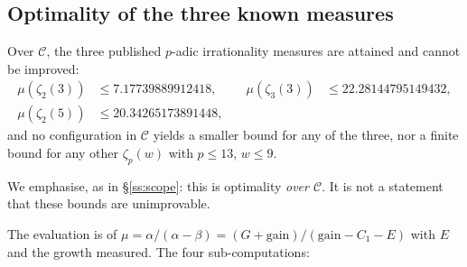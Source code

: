 \subsection{Optimality of the three known measures}\label{ss:optimal}

\begin{theorem}\label{thm:optimal}
 Over $\mathcal C$, the three
published $p$-adic irrationality measures are attained and cannot be improved:
\[
\begin{aligned}
 \mu(\zeta_2(3))&\le7.17739889912418, &\quad
 \mu(\zeta_3(3))&\le22.28144795149432,\\
 \mu(\zeta_2(5))&\le20.34265173891448, &&
\end{aligned}
\]
and no configuration in $\mathcal C$ yields a smaller bound for any of the three, nor a
finite bound for any other $\zeta_p(w)$ with $p\le13$, $w\le9$.
\end{theorem}

We emphasise, as in \S\ref{ss:scope}: this is optimality \emph{over $\mathcal C$}. It is not
a statement that these bounds are unimprovable.

The evaluation is of $\mu=\alpha/(\alpha-\beta)=(G+\mathrm{gain})/(\mathrm{gain}-C_1-E)$
with $E$ and the growth measured. The four sub-computations:

